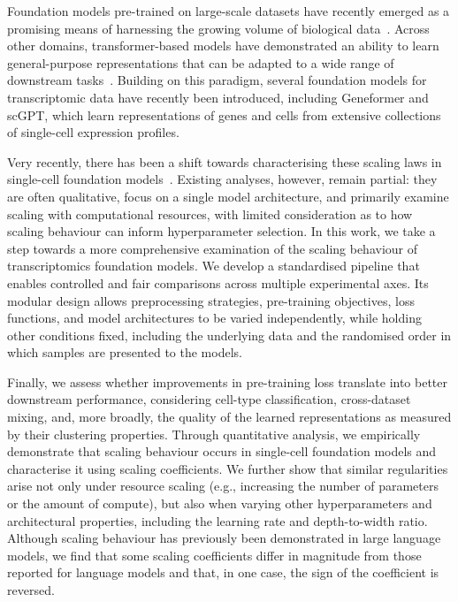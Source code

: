 \documentclass[pdflatex,sn-nature]{sn-jnl}%
\theoremstyle{thmstyleone}%
\theoremstyle{thmstyletwo}%
\theoremstyle{thmstylethree}%
\begin{document}
Foundation models pre-trained on large-scale datasets have recently emerged as a promising means of harnessing the growing volume of biological data~\cite{Theodoris2023,Cui2024}.
Across other domains, transformer-based models have demonstrated an ability to learn general-purpose representations that can be adapted to a wide range of downstream tasks~\cite{Brown2020}.
Building on this paradigm, several foundation models for transcriptomic data have recently been introduced, including Geneformer and scGPT, which learn representations of genes and cells from extensive collections of single-cell expression profiles.

Very recently, there has been a shift towards characterising these scaling laws in single-cell foundation models~\cite{Hao2024,Fischer2024,Rizvi2025,Adduri2025,Gandhi2025,Dong2026,Chen2026,DenAdel2026}.
Existing analyses, however, remain partial: they are often qualitative, focus on a single model architecture, and primarily examine scaling with computational resources, with limited consideration as to how scaling behaviour can inform hyperparameter selection.
In this work, we take a step towards a more comprehensive examination of the scaling behaviour of transcriptomics foundation models. 
We develop a standardised pipeline that enables controlled and fair comparisons across multiple experimental axes. 
Its modular design allows preprocessing strategies, pre-training objectives, loss functions, and model architectures to be varied independently, while holding other conditions fixed, including the underlying data and the randomised order in which samples are presented to the models.

Finally, we assess whether improvements in pre-training loss translate into better downstream performance, considering cell-type classification, cross-dataset mixing, and, more broadly, the quality of the learned representations as measured by their clustering properties.
Through quantitative analysis, we empirically demonstrate that scaling behaviour occurs in single-cell foundation models and characterise it using scaling coefficients. 
We further show that similar regularities arise not only under resource scaling (e.g., increasing the number of parameters or the amount of compute), but also when varying other hyperparameters and architectural properties, including the learning rate and depth-to-width ratio.
Although scaling behaviour has previously been demonstrated in large language models, we find that some scaling coefficients differ in magnitude from those reported for language models and that, in one case, the sign of the coefficient is reversed.
\end{document}
